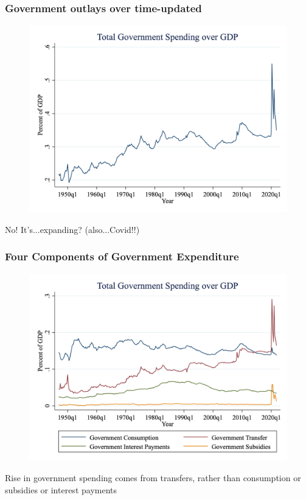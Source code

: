 \documentclass{beamer}
\begin{document}
\begin{frame}
\frametitle[alignment=center]{Government outlays over time-updated}
\begin{figure}
\centering
\includegraphics[scale=0.2]{Figures/GoverY_2.png}
\end{figure}
No!  It's...expanding? (also...Covid!!)
\end{frame}

\begin{frame}
\frametitle[alignment=center]{Four Components of Government Expenditure}
\begin{figure}
\centering
\includegraphics[scale=0.2]{Figures/GoverY_3.png}
\end{figure}
Rise in government spending comes from transfers, rather than consumption or subsidies or interest payments
\end{frame}
\end{document}
